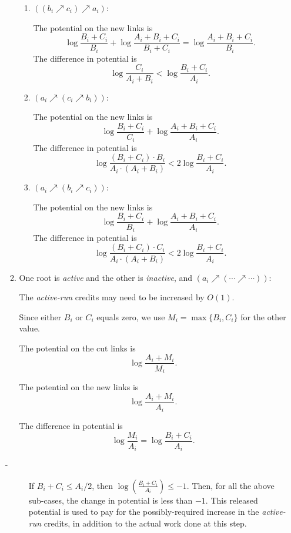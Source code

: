 \begin{enumerate}
\begin{enumerate}
\begin{enumerate}
\item $((b_i \nearrow c_i) \nearrow a_i)$:

The potential on the new links is
\[\log{\frac{B_i+C_i}{B_i}} + \log{\frac{A_i+B_i+C_i}{B_i+C_i}} = \log{\frac{A_i+B_i+C_i}{B_i}}.\] 
The difference in potential is
\[\log{\frac{C_i}{A_i+B_i}} < \log{\frac{B_i+C_i}{A_i}}.\] 
 
\item $(a_i \nearrow (c_i \nearrow b_i))$:

The potential on the new links is 
\[\log{\frac{B_i+C_i}{C_i}} + \log{\frac{A_i+B_i+C_i}{A_i}}.\] 
The difference in potential is
\[\log{\frac{(B_i+C_i) \cdot B_i}{A_i \cdot (A_i+B_i)}} < 2 \log{\frac{B_i+C_i}{A_i}}.\] 
 
\item $(a_i \nearrow (b_i \nearrow c_i))$:

The potential on the new links is
\[\log{\frac{B_i+C_i}{B_i}} + \log{\frac{A_i+B_i+C_i}{A_i}}.\] 
The difference in potential is
\[\log{\frac{(B_i+C_i) \cdot C_i}{A_i \cdot (A_i+B_i)}} < 2 \log{\frac{B_i+C_i}{A_i}}. \] 

\end{enumerate}



\item One root is {\it active} and the other is {\it inactive}, and $(a_i \nearrow (\cdots \nearrow \cdots))$:

The {\it active-run} credits may need to be increased by $O(1)$. 

Since either $B_i$ or $C_i$ equals zero, we use $M_i = \max{\{B_i, C_i\}}$ for the other value.

 
The potential on the cut links is
\[\log{\frac{A_i+ M_i}{M_i}}.\]

The potential on the new links is
\[\log{\frac{A_i+M_i}{A_i}}.\] 

The difference in potential is
\[\log{\frac{M_i}{A_i}} = \log{\frac{B_i+C_i}{A_i}}.\] 

\end{enumerate}

\vspace{.1in}

\begin{description}

\item[-] If $B_i+C_i \leq A_i/2$, then $\log{(\frac{B_i+C_i}{A_i})} \leq -1$. Then, for all the above sub-cases, the change in potential is less than $-1$. This released potential is used to pay for the possibly-required increase in the {\it active-run} credits, in addition to the actual work done at this step. 


\end{description}
\end{enumerate}
